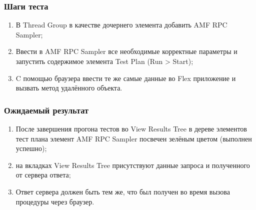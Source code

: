 \subsubsection{Шаги теста}

\begin{enumerate}
\item В Thread Group в качестве дочернего элемента добавить AMF RPC Sampler;
\item Ввести в AMF RPC Sampler все необходимые корректные параметры и запустить содержимое элемента Test Plan (Run > Start);
\item C помощью браузера ввести те же самые данные во Flex приложение и вызвать метод удалённого объекта.
\end{enumerate}

\subsubsection{Ожидаемый результат}

\begin{enumerate}
\item После завершения прогона тестов во View Results Tree в дереве элементов тест плана элемент AMF RPC Sampler
посвечен зелёным цветом (выполнен успешно);
\item на вкладках View Results Tree присутствуют данные запроса и полученного от сервера ответа;
\item Ответ сервера должен быть тем же, что был получен во время вызова процедуры через браузер.

\end{enumerate}
